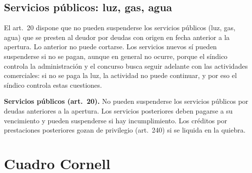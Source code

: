 \documentclass[12pt,oneside]{book}
\begin{document}
\subsection{Servicios públicos: luz, gas, agua}

El art.~20 dispone que no pueden suspenderse los servicios públicos (luz, gas, agua) que se presten al deudor por deudas con origen en fecha anterior a la apertura. Lo anterior no puede cortarse. Los servicios nuevos sí pueden suspenderse si no se pagan, aunque en general no ocurre, porque el síndico controla la administración y el concurso busca seguir adelante con las actividades comerciales: si no se paga la luz, la actividad no puede continuar, y por eso el síndico controla estas cuestiones.

\begin{important}
\textbf{Servicios públicos (art.~20).} No pueden suspenderse los servicios públicos por deudas anteriores a la apertura. Los servicios posteriores deben pagarse a su vencimiento y pueden suspenderse si hay incumplimiento. Los créditos por prestaciones posteriores gozan de privilegio (art.~240) si se liquida en la quiebra.
\end{important}

\section{Cuadro Cornell}
\end{document}
